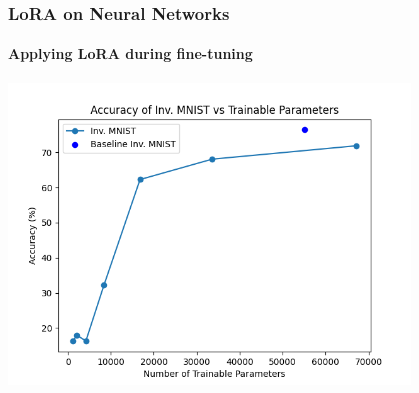 \documentclass{beamer}
\begin{document}
    \begin{frame}
        \frametitle{LoRA on Neural Networks}
        \framesubtitle{Applying LoRA during fine-tuning}
        \begin{center}
            \includegraphics[width=0.8\textwidth]{images/inverse mnist plot.png} %
        \end{center}
    \end{frame}
\end{document}
